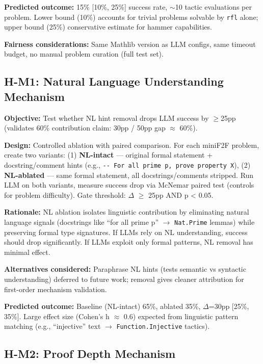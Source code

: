 \textbf{Predicted outcome:} 15\% [10\%, 25\%] success rate, $\sim$10 tactic evaluations per problem. Lower bound (10\%) accounts for trivial problems solvable by \texttt{rfl} alone; upper bound (25\%) conservative estimate for hammer capabilities.

\textbf{Fairness considerations:} Same Mathlib version as LLM configs, same timeout budget, no manual problem curation (full test set).

\subsection{H-M1: Natural Language Understanding Mechanism}

\textbf{Objective:} Test whether NL hint removal drops LLM success by $\geq$25pp (validates 60\% contribution claim: 30pp / 50pp gap $\approx$ 60\%).

\textbf{Design:} Controlled ablation with paired comparison. For each miniF2F problem, create two variants: (1) \textbf{NL-intact} --- original formal statement + docstring/comment hints (e.g., \texttt{-{}- For all prime p, prove property X}), (2) \textbf{NL-ablated} --- same formal statement, all docstrings/comments stripped. Run LLM on both variants, measure success drop via McNemar paired test (controls for problem difficulty). Gate threshold: $\Delta$ $\geq$ 25pp AND p < 0.05.

\textbf{Rationale:} NL ablation isolates linguistic contribution by eliminating natural language signals (docstrings like ``for all prime p'' $\rightarrow$ \texttt{Nat.Prime} lemmas) while preserving formal type signatures. If LLMs rely on NL understanding, success should drop significantly. If LLMs exploit only formal patterns, NL removal has minimal effect.

\textbf{Alternatives considered:} Paraphrase NL hints (tests semantic vs syntactic understanding) deferred to future work; removal gives cleaner attribution for first-order mechanism validation.

\textbf{Predicted outcome:} Baseline (NL-intact) 65\%, ablated 35\%, $\Delta$=30pp [25\%, 35\%]. Large effect size (Cohen's h $\approx$ 0.6) expected from linguistic pattern matching (e.g., ``injective'' text $\rightarrow$ \texttt{Function.Injective} tactics).

\subsection{H-M2: Proof Depth Mechanism}

